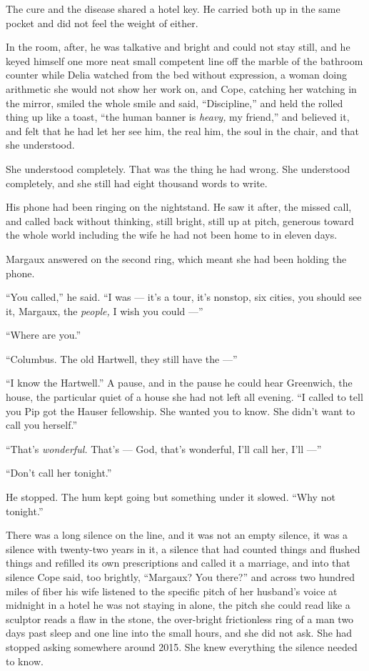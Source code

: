 \documentclass[11pt,openany]{book}
\newcommand{\scenebreak}{\par\vspace{0.5\baselineskip}\begin{center}\textasteriskcentered\quad\textasteriskcentered\quad\textasteriskcentered\end{center}\vspace{0.5\baselineskip}\par}
\begin{document}
The cure and the disease shared a hotel key. He carried both up in the same pocket and did not feel the weight of either.

In the room, after, he was talkative and bright and could not stay still, and he keyed himself one more neat small competent line off the marble of the bathroom counter while Delia watched from the bed without expression, a woman doing arithmetic she would not show her work on, and Cope, catching her watching in the mirror, smiled the whole smile and said, ``Discipline,'' and held the rolled thing up like a toast, ``the human banner is \textit{heavy,} my friend,'' and believed it, and felt that he had let her see him, the real him, the soul in the chair, and that she understood.

She understood completely. That was the thing he had wrong. She understood completely, and she still had eight thousand words to write.


\scenebreak


His phone had been ringing on the nightstand. He saw it after, the missed call, and called back without thinking, still bright, still up at pitch, generous toward the whole world including the wife he had not been home to in eleven days.

Margaux answered on the second ring, which meant she had been holding the phone.

``You called,'' he said. ``I was --- it's a tour, it's nonstop, six cities, you should see it, Margaux, the \textit{people,} I wish you could ---''

``Where are you.''

``Columbus. The old Hartwell, they still have the ---''

``I know the Hartwell.'' A pause, and in the pause he could hear Greenwich, the house, the particular quiet of a house she had not left all evening. ``I called to tell you Pip got the Hauser fellowship. She wanted you to know. She didn't want to call you herself.''

``That's \textit{wonderful.} That's --- God, that's wonderful, I'll call her, I'll ---''

``Don't call her tonight.''

He stopped. The hum kept going but something under it slowed. ``Why not tonight.''

There was a long silence on the line, and it was not an empty silence, it was a silence with twenty-two years in it, a silence that had counted things and flushed things and refilled its own prescriptions and called it a marriage, and into that silence Cope said, too brightly, ``Margaux? You there?'' and across two hundred miles of fiber his wife listened to the specific pitch of her husband's voice at midnight in a hotel he was not staying in alone, the pitch she could read like a sculptor reads a flaw in the stone, the over-bright frictionless ring of a man two days past sleep and one line into the small hours, and she did not ask. She had stopped asking somewhere around 2015. She knew everything the silence needed to know.
\end{document}
